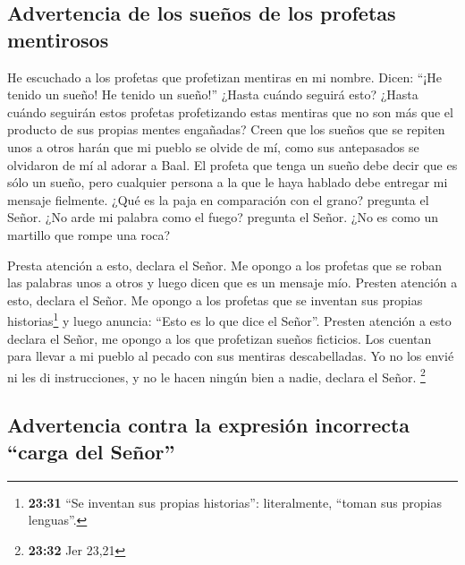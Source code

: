 \hypertarget{advertencia-de-los-sueuxf1os-de-los-profetas-mentirosos}{%
\subsection{Advertencia de los sueños de los profetas
mentirosos}\label{advertencia-de-los-sueuxf1os-de-los-profetas-mentirosos}}

 He escuchado a los profetas que profetizan mentiras en
mi nombre. Dicen: ``¡He tenido un sueño! He tenido un sueño!''
 ¿Hasta cuándo seguirá esto? ¿Hasta cuándo seguirán estos
profetas profetizando estas mentiras que no son más que el producto de
sus propias mentes engañadas?  Creen que los sueños que
se repiten unos a otros harán que mi pueblo se olvide de mí, como sus
antepasados se olvidaron de mí al adorar a Baal.  El
profeta que tenga un sueño debe decir que es sólo un sueño, pero
cualquier persona a la que le haya hablado debe entregar mi mensaje
fielmente. ¿Qué es la paja en comparación con el grano? pregunta el
Señor.  ¿No arde mi palabra como el fuego? pregunta el
Señor. ¿No es como un martillo que rompe una roca?

 Presta atención a esto, declara el Señor. Me opongo a
los profetas que se roban las palabras unos a otros y luego dicen que es
un mensaje mío.  Presten atención a esto, declara el
Señor. Me opongo a los profetas que se inventan sus propias
historias\footnote{\textbf{23:31} ``Se inventan sus propias historias'':
  literalmente, ``toman sus propias lenguas''.} y luego anuncia: ``Esto
es lo que dice el Señor''.  Presten atención a esto
declara el Señor, me opongo a los que profetizan sueños ficticios. Los
cuentan para llevar a mi pueblo al pecado con sus mentiras
descabelladas. Yo no los envié ni les di instrucciones, y no le hacen
ningún bien a nadie, declara el Señor. \footnote{\textbf{23:32} Jer
  23,21}

\hypertarget{advertencia-contra-la-expresiuxf3n-incorrecta-carga-del-seuxf1or}{%
\subsection{Advertencia contra la expresión incorrecta ``carga del
Señor''}\label{advertencia-contra-la-expresiuxf3n-incorrecta-carga-del-seuxf1or}}

